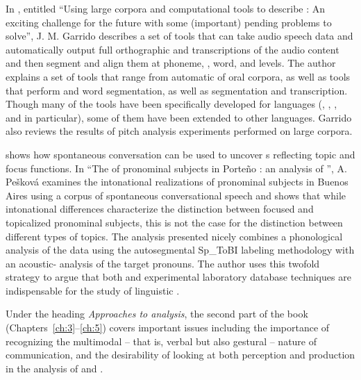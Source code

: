 \documentclass[output=paper]{langsci/langscibook}
\begin{document}
In \textbf{}, entitled ``Using large corpora and computational tools to describe : An exciting challenge for the future with some (important) pending problems to solve”, J. M. Garrido describes a set of tools that can take audio speech data and automatically output full orthographic and  transcriptions of the audio content and then segment and align them at phoneme, , word, and  levels. The author explains a set of tools that range from automatic  of oral corpora, as well as tools that perform  and word segmentation, as well as  segmentation and  transcription. Though many of the tools have been specifically developed for  languages (, , , and  in particular), some of them have been extended to other languages. Garrido also reviews the results of pitch analysis experiments performed on large corpora. 

\textbf{} shows how spontaneous conversation can be used to uncover s reflecting topic and focus functions. In ``The  of pronominal subjects in Porteño : an analysis of ”, A. Pešková examines the intonational realizations of pronominal subjects in Buenos Aires  using a corpus of spontaneous conversational speech and shows that while intonational differences characterize the distinction between focused and topicalized pronominal subjects, this is not the case for the distinction between different types of topics. The analysis presented nicely combines a phonological analysis of the data using the autosegmental Sp\_ToBI  labeling methodology with an acoustic- analysis of the target pronouns. The author uses this twofold strategy to argue that both  and experimental laboratory database techniques are indispensable for the study of linguistic .

Under the heading \textit{Approaches to  analysis}, the second part of the book (Chapters~\ref{ch:3}--\ref{ch:5}) covers important issues including the importance of recognizing the multimodal – that is, verbal but also gestural – nature of communication, and the desirability of looking at both perception and production in the analysis of  and . 
\end{document}
